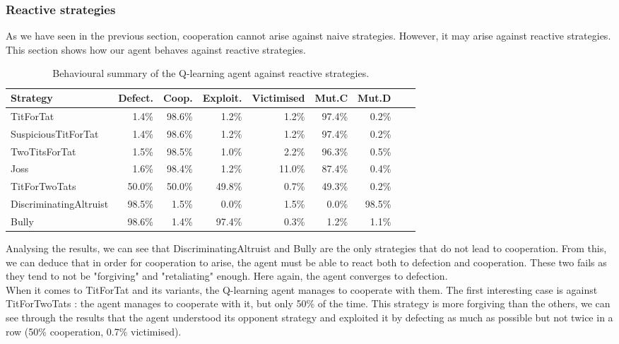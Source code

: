 \documentclass[11pt, a4paper]{article}
\begin{document}
\subsubsection{Reactive strategies}
 As we have seen in the previous section, cooperation cannot arise against naive strategies. However, it may arise against reactive strategies. This section shows how our agent behaves against reactive strategies.

\begin{table}[H]
  \centering
  \caption{Behavioural summary of the Q-learning agent against reactive strategies.}
  \label{tab:results2}
  \begin{tabular}{lrr||rrrrrr}
    \toprule
    Strategy & Defect. & Coop. & Exploit. & Victimised & Mut.C & Mut.D \\
    \midrule
    
    TitForTat              & 1.4\%  & 98.6\% & 1.2\% & 1.2\% & 97.4\% & 0.2\% \\
    SuspiciousTitForTat    & 1.4\%  & 98.6\% & 1.2\% & 1.2\% & 97.4\% & 0.2\% \\
    TwoTitsForTat          & 1.5\%  & 98.5\% & 1.0\% & 2.2\% & 96.3\% & 0.5\% \\
    Joss                   & 1.6\%  & 98.4\% & 1.2\% & 11.0\% & 87.4\% & 0.4\% \\
    TitForTwoTats          & 50.0\% & 50.0\% & 49.8\% & 0.7\% & 49.3\% & 0.2\% \\
    DiscriminatingAltruist & 98.5\% & 1.5\%  & 0.0\% & 1.5\% & 0.0\% & 98.5\% \\
    Bully                  & 98.6\% & 1.4\%  & 97.4\% & 0.3\% & 1.2\% & 1.1\% \\
    \bottomrule
  \end{tabular}
\end{table}

Analysing the results, we can see that DiscriminatingAltruist and Bully are the only strategies that do not lead to cooperation. From this, we can deduce that in order for cooperation to arise, the agent must be able to react both to defection and cooperation.
These two fails as they tend to not be "forgiving" and "retaliating" enough. Here again, the agent converges to defection. \\

When it comes to TitForTat and its variants, the Q-learning agent manages to cooperate with them. 
The first interesting case is against TitForTwoTats : the agent manages to cooperate with it, but only 50\% of the time. 
This strategy is more forgiving than the others, we can see through the results that the agent understood its opponent strategy and exploited it by defecting as much as possible but not twice in a row (50\% cooperation, 0.7\% victimised). \\
\end{document}

